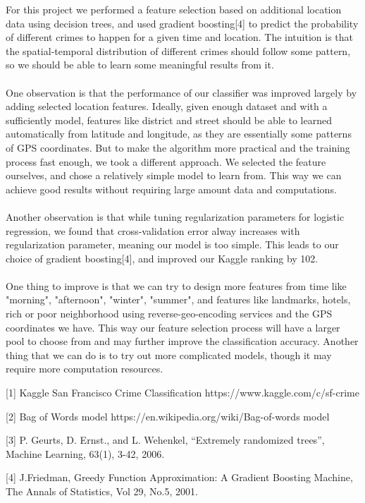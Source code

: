 \documentclass[12pt]{article}
\newenvironment{p5}[2][Part VI Discussion and Future Work]{\begin{trivlist}
\item[\hskip \labelsep {\bfseries #1}\hskip \labelsep {\bfseries #2}]}{\end{trivlist}}
\newenvironment{p6}[2][References]{\begin{trivlist}
\item[\hskip \labelsep {\bfseries #1}\hskip \labelsep {\bfseries #2}]}{\end{trivlist}}
\begin{document}
\newpage
\begin{p5}{}
\item{}
For this project we performed a feature selection based on additional location data using decision trees, and used gradient boosting[4] to predict the probability of different crimes to happen for a given time and location. The intuition is that the spatial-temporal distribution of different crimes should follow some pattern, so we should be able to learn some meaningful results from it.\\\\
One observation is that the performance of our classifier was improved largely by adding selected location features. Ideally, given enough dataset and with a sufficiently model, features like district and street should be able to learned automatically from latitude and longitude, as they are essentially some patterns of GPS coordinates. But to make the algorithm more practical and the training process fast enough, we took a different approach. We selected the feature ourselves, and chose a relatively simple model to learn from. This way we can achieve good results without requiring large amount data and computations.\\\\
Another observation is that while tuning regularization parameters for logistic regression, we found that cross-validation error alway increases with regularization parameter, meaning our model is too simple. This leads to our choice of gradient boosting[4], and improved our Kaggle ranking by 102.\\\\
One thing to improve is that we can try to design more features from time like "morning", "afternoon", "winter", "summer", and features like landmarks, hotels, rich or poor neighborhood using reverse-geo-encoding services and the GPS coordinates we have. This way our feature selection process will have a larger pool to choose from and may further improve the classification accuracy. Another thing that we can do is to try out more complicated models, though it may require more computation resources.
\end{p5}{}
\begin{p6}{}
\item{}
[1] Kaggle San Francisco Crime Classification https://www.kaggle.com/c/sf-crime
\item{}
[2] Bag of Words model https://en.wikipedia.org/wiki/Bag-of-words model 
\item{}
[3] P. Geurts, D. Ernst., and L. Wehenkel, ``Extremely randomized trees'', Machine Learning, 63(1), 3-42, 2006.
\item{}
[4] J.Friedman, Greedy Function Approximation: A Gradient Boosting Machine, The Annals of Statistics, Vol 29, No.5, 2001.
\end{p6}

 
\end{document}
